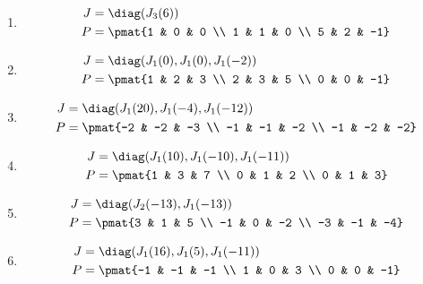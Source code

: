 \begin{enumerate}
\item

\begin{align*}
J &= \diag(J_{3}(6))\\
P &= \pmat{1 & 0 & 0 \\ 1 & 1 & 0 \\ 5 & 2 & -1}
\end{align*}

\item

\begin{align*}
J &= \diag(J_{1}(0), J_{1}(0), J_{1}(-2))\\
P &= \pmat{1 & 2 & 3 \\ 2 & 3 & 5 \\ 0 & 0 & -1}
\end{align*}

\item

\begin{align*}
J &= \diag(J_{1}(20), J_{1}(-4), J_{1}(-12))\\
P &= \pmat{-2 & -2 & -3 \\ -1 & -1 & -2 \\ -1 & -2 & -2}
\end{align*}

\item

\begin{align*}
J &= \diag(J_{1}(10), J_{1}(-10), J_{1}(-11))\\
P &= \pmat{1 & 3 & 7 \\ 0 & 1 & 2 \\ 0 & 1 & 3}
\end{align*}

\item

\begin{align*}
J &= \diag(J_{2}(-13), J_{1}(-13))\\
P &= \pmat{3 & 1 & 5 \\ -1 & 0 & -2 \\ -3 & -1 & -4}
\end{align*}

\item

\begin{align*}
J &= \diag(J_{1}(16), J_{1}(5), J_{1}(-11))\\
P &= \pmat{-1 & -1 & -1 \\ 1 & 0 & 3 \\ 0 & 0 & -1}
\end{align*}


\end{enumerate}
